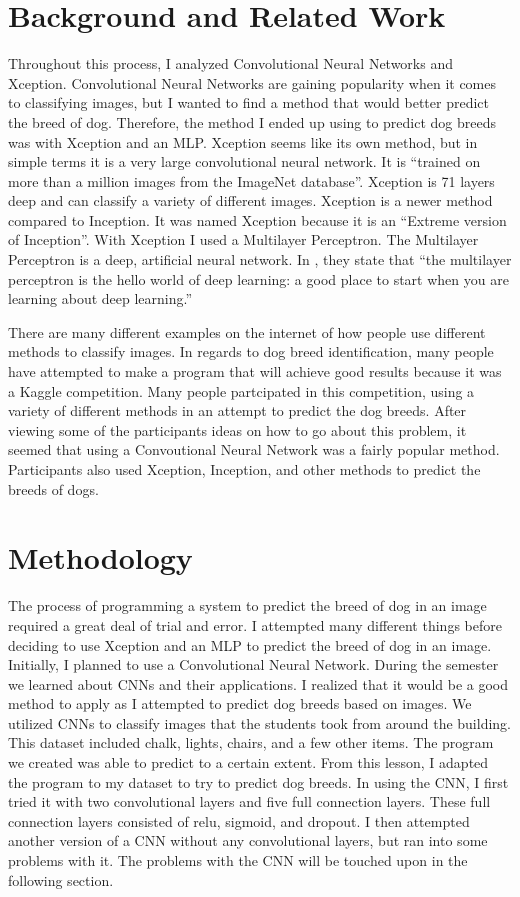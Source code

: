 \documentclass[12pt]{article}
\begin{document}
\section{Background and Related Work}
\quad Throughout this process, I analyzed Convolutional Neural Networks and Xception.  Convolutional Neural Networks are gaining popularity when it comes to classifying images, but I wanted to find a method that would better predict the breed of dog.  Therefore, the method I ended up using to predict dog breeds was with Xception and an MLP.  Xception seems like its own method, but in simple terms it is a very large convolutional neural network.  It is ``trained on more than a million images from the ImageNet database''\cite{MathWorks}.  Xception is 71 layers deep and can classify a variety of different images.  Xception is a newer method compared to Inception.  It was named Xception because it is an ``Extreme version of Inception''\cite{Tsang2018}.  With Xception I used a Multilayer Perceptron.  The Multilayer Perceptron is a deep, artificial neural network.  In \cite{Skymind}, they state that ``the multilayer perceptron is the hello world of deep learning: a good place to start when you are learning about deep learning.''

There are many different examples on the internet of how people use different methods to classify images.  In regards to dog breed identification, many people have attempted to make a program that will achieve good results because it was a Kaggle competition.  Many people partcipated in this competition, using a variety of different methods in an attempt to predict the dog breeds.  After viewing some of the participants ideas on how to go about this problem, it seemed that using a Convoutional Neural Network was a fairly popular method.  Participants also used Xception, Inception, and other methods to predict the breeds of dogs.

\section{Methodology}
\quad The process of programming a system to predict the breed of dog in an image required a great deal of trial and error.  I attempted many different things before deciding to use Xception and an MLP to predict the breed of dog in an image.  Initially, I planned to use a Convolutional Neural Network.  During the semester we learned about CNNs and their applications.  I realized that it would be a good method to apply as I attempted to predict dog breeds based on images.  We utilized CNNs to classify images that the students took from around the building.  This dataset included chalk, lights, chairs, and a few other items.  The program we created was able to predict to a certain extent.  From this lesson, I adapted the program to my dataset to try to predict dog breeds.  In using the CNN, I first tried it with two convolutional layers and five full connection layers.  These full connection layers consisted of relu, sigmoid, and dropout.  I then attempted another version of a CNN without any convolutional layers, but ran into some problems with it.  The problems with the CNN will be touched upon in the following section.
\end{document}
